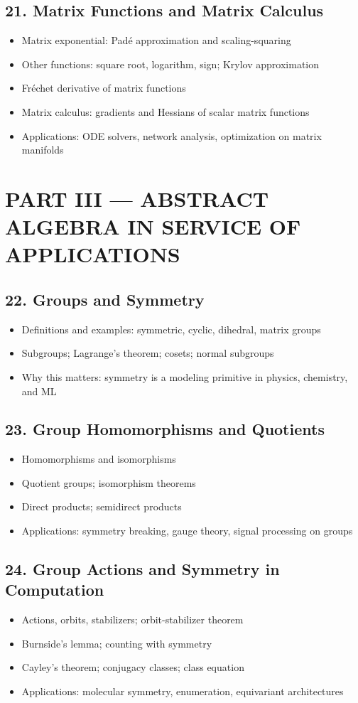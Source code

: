 \subsection{21. Matrix Functions and Matrix Calculus}
\begin{itemize}
\item Matrix exponential: Pad\'e approximation and scaling-squaring
\item Other functions: square root, logarithm, sign; Krylov approximation
\item Fr\'echet derivative of matrix functions
\item Matrix calculus: gradients and Hessians of scalar matrix functions
\item Applications: ODE solvers, network analysis, optimization on matrix manifolds
\end{itemize}

\section{PART III --- ABSTRACT ALGEBRA IN SERVICE OF APPLICATIONS}

\subsection{22. Groups and Symmetry}
\begin{itemize}
\item Definitions and examples: symmetric, cyclic, dihedral, matrix groups
\item Subgroups; Lagrange's theorem; cosets; normal subgroups
\item Why this matters: symmetry is a modeling primitive in physics, chemistry, and ML
\end{itemize}

\subsection{23. Group Homomorphisms and Quotients}
\begin{itemize}
\item Homomorphisms and isomorphisms
\item Quotient groups; isomorphism theorems
\item Direct products; semidirect products
\item Applications: symmetry breaking, gauge theory, signal processing on groups
\end{itemize}

\subsection{24. Group Actions and Symmetry in Computation}
\begin{itemize}
\item Actions, orbits, stabilizers; orbit-stabilizer theorem
\item Burnside's lemma; counting with symmetry
\item Cayley's theorem; conjugacy classes; class equation
\item Applications: molecular symmetry, enumeration, equivariant architectures
\end{itemize}

